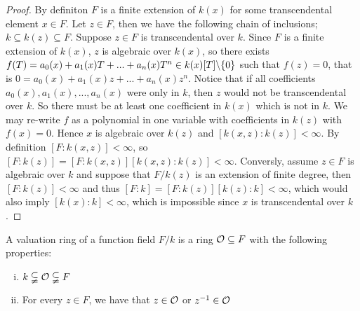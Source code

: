\begin{proof}
    By definiton $F$ is a finite extension of $k(x)$ for some transcendental 
    element $x\in F$. Let $z \in F $, then we have the following chain of 
    inclusions; $ k \subseteq k(z) \subseteq F$. Suppose $z \in F $ is 
    transcendental over $k$. Since $F$ is a finite extension of $k(x)$, 
    $z$ is algebraic over $k(x)$, so there exists 
    $f(T) = a_0(x) + a_1(x)T + ... + a_n(x)T^n \in k(x)[T] \backslash \lbrace 0 \rbrace $ 
    such that $f(z)= 0$, that is $0 = a_0(x) + a_1(x)z + ... + a_n(x)z^n$. 
    Notice that if all coefficients $a_0(x),a_1(x),...,a_n(x)$ were only in
    $k$, then $z$ would not be transcendental over $k$. So there must be at 
    least one coefficient in $k(x)$ which is not in $k$. We may re-write $f$ 
    as a polynomial in one variable with coefficients in $k(z)$ with $f(x) = 0 $. 
    Hence $x$ is algebraic over $k(z)$ and $[k(x,z) : k(z) ] < \infty$. 
    By definition $[F : k(x,z)] < \infty $, so $[F : k(z)] = [F: k(x,z)][k(x,z) : k(z)] < \infty$. 
    Conversly, assume $z \in F $ is algebraic over $k$ and suppose that $F/k(z)$ 
    is an extension of finite degree, then $[F : k(z)] < \infty $ and thus 
    $[F:k ] = [F: k(z)][k(z) : k ] < \infty $, which would also imply 
    $[k(x) : k ] < \infty$, which is impossible since $x$ is transcendental over $k$.  
\end{proof}

\begin{definition} \label{valuationRing}
    A valuation ring of a function field $F/k$ is a ring 
    $\mathcal{O} \subseteq F $ with the following properties:
    \begin{enumerate}[(i)]
        \item \label{strictContain} $k \subsetneqq \mathcal{O} \subsetneqq F$
        \item \label{zorzinvers} For every $z \in F $, we have that $z \in \mathcal{O} $ or $ z^{-1} \in \mathcal{O}$
    \end{enumerate}
\end{definition}

